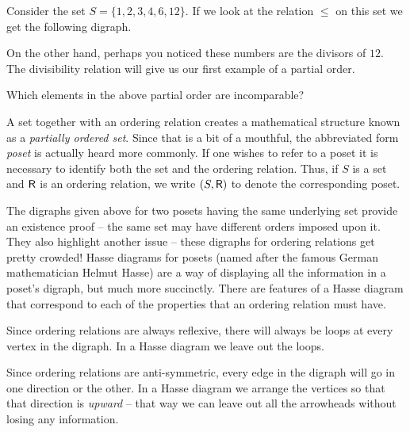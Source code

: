 Consider the set $S = \{1, 2, 3, 4, 6, 12 \}$.  If we look at the
relation $\leq$ on this set we get the following digraph.

\begin{center}

\end{center}

On the other hand, perhaps you noticed these numbers are the 
divisors of $12$.  The divisibility relation will give us our
first example of a partial order.

\begin{center}

\end{center}

\begin{exer}
Which elements in the above partial order are incomparable?
\end{exer}

A set together with an ordering relation creates a mathematical 
structure known as a \emph{partially
ordered set}.  Since that is a bit of a mouthful, the abbreviated
form \emph{poset} is actually heard more commonly.  
If one wishes to refer to a poset it is necessary to identify
both the set and the ordering relation.  Thus, if $S$ is a set
and $\mbox{\textsf R}$ is an ordering relation, we write $(S, \mbox{\textsf R})$ to
denote the corresponding poset.  

The digraphs given above for two posets having the same underlying
set provide an existence proof -- the same set may have different 
orders imposed upon it.  They also highlight another issue -- these
digraphs for ordering relations get pretty crowded!  
Hasse diagrams
for posets (named after the famous German mathematician 
Helmut Hasse) are a way of displaying all the 
information in a poset's digraph, but much more succinctly.  There
are features of a Hasse diagram that correspond to each of the 
properties that an ordering relation must have.  

Since ordering relations are always reflexive, there will always 
be loops at every vertex in the digraph.  In a Hasse diagram we
leave out the loops.

Since ordering relations are anti-symmetric, every edge in the digraph
will go in one direction or the other.  In a Hasse diagram we arrange
the vertices so that that direction is \emph{upward} -- that way we
can leave out all the arrowheads without losing any information.

